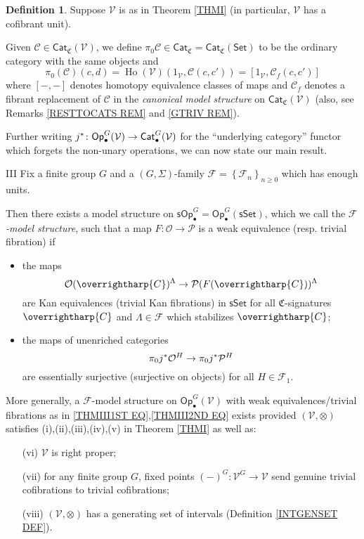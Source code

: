 \documentclass[a4paper,10pt
,draft
]{article}%
\numberwithin{equation}{section}
\numberwithin{figure}{section}
\theoremstyle{definition} %
\newtheorem{definition}[equation]{Definition}%
\newcommand{\set}[1]{\left\{#1\right\}}%
\newcommand{\vect}[1]{\text{\overrightharp{\ensuremath{#1}}}}
\newcommand{\Cat}{\mathsf{Cat}}
\newcommand{\Op}{\mathsf{Op}}%
\DeclareMathOperator{\Ho}{Ho}
\newcommand{\F}{\ensuremath{\mathcal F}}
\newcommand{\V}{\ensuremath{\mathcal V}}
\renewcommand{\O}{\ensuremath{\mathcal O}}
\newcommand{\1}{\ensuremath{\mathbbm 1}}%
\begin{document}
\begin{definition}
	Suppose $\V$ is as in Theorem \ref{THMI}
	(in particular, $\V$ has a cofibrant unit).

	Given $\mathcal C \in \Cat_{\mathfrak{C}}(\V)$, we define 
	$\pi_0 \mathcal C \in \Cat_{\mathfrak{C}} = \Cat_{\mathfrak{C}}(\mathsf{Set})$ 
	to be the ordinary category with the same objects and
\[
	\pi_0(\mathcal{C})(c,d)=
	\Ho(\V)(1_\V, \mathcal C(c,c'))=
	[1_\V, \mathcal{C}_f(c,c')]
\]
where $[-,-]$ denotes homotopy equivalence classes of maps
and $\mathcal{C}_f$ denotes a fibrant replacement of
$\mathcal C$ in the \emph{canonical model structure} on $\Cat_{\mathfrak{C}}(\V)$
\cite{BM13} (also, see Remarks 
\ref{RESTTOCATS REM} and \ref{GTRIV REM}).
\end{definition}

Further writing 
$j^{\**} \colon 
\mathsf{Op}^G_{\bullet}(\V) \to \mathsf{Cat}^G_{\bullet}(\V)$
for the ``underlying category''
functor which forgets the non-unary operations, 
we can now state our main result.




\begin{customthm}{III}\label{THMIII}
Fix a finite group $G$ 
and a $(G,\Sigma)$-family $\F = \set{\F_n}_{n \geq 0}$
which has enough units.

Then there exists a model structure on
$\mathsf{sOp}^G_{\bullet} = 
\mathsf{Op}^G_{\bullet}(\mathsf{sSet})$,
which we call the \emph{$\F$-model structure},
such that a map
$F\colon \mathcal{O} \to \mathcal{P}$
is a weak equivalence (resp. trivial fibration) if
\begin{itemize}
\item the maps
\begin{equation}\label{THMIII1ST EQ}
	\O(\vect{C})^{\Lambda} \to \mathcal{P}(F(\vect{C}))^{\Lambda}
\end{equation}
are Kan equivalences (trivial Kan fibrations)
in $\mathsf{sSet}$
for all $\mathfrak{C}$-signatures $\vect{C}$
and $\Lambda \in \F$ which stabilizes $\vect{C}$;
\item 
the maps of unenriched categories
\begin{equation}\label{THMIII2ND EQ}
\pi_0 j^{\**} \O^H 
\to 
\pi_0 j^{\**} \mathcal{P}^H 
\end{equation}
are essentially surjective (surjective on objects)
for all $H \in \F_1$.
\end{itemize}
More generally, a $\F$-model structure on 
$\Op^G_{\bullet}(\V)$
with weak equivalences/trivial fibrations as in 
\eqref{THMIII1ST EQ},\eqref{THMIII2ND EQ}
exists provided $(\V,\otimes)$ satisfies 
(i),(ii),(iii),(iv),(v) in Theorem \ref{THMI}
as well as:
\begin{enumerate}
	\item[(vi)] $\V$ is right proper;
	\item[(vii)]
	for any finite group $G$, fixed points
	$(-)^{G} \colon \V^G \to \V$
	send genuine trivial cofibrations to trivial cofibrations;
	\item[(viii)] $(\V, \otimes)$ has a generating set of intervals
	(Definition \ref{INTGENSET DEF}).
\end{enumerate}
\end{customthm}
\end{document}
